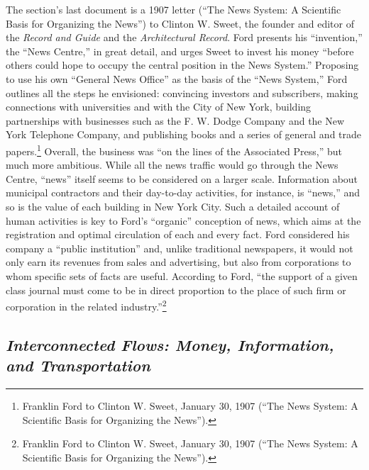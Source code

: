 \documentclass[openany,nobib]{tufte-book}
\begin{document}
The section's last document is a 1907 letter (``The News System: A
Scientific Basis for Organizing the News'') to Clinton W. Sweet, the
founder and editor of the \emph{Record and Guide} and the
\emph{Architectural Record}. Ford presents his ``invention,'' the ``News
Centre,'' in great detail, and urges Sweet to invest his money ``before
others could hope to occupy the central position in the News System.''
Proposing to use his own ``General News Office'' as the basis of the
``News System,'' Ford outlines all the steps he envisioned: convincing
investors and subscribers, making connections with universities and with
the City of New York, building partnerships with businesses such as the
F. W. Dodge Company and the New York Telephone Company, and publishing
books and a series of general and trade papers.\footnote{Franklin Ford
  to Clinton W. Sweet, January 30, 1907 (``The News System: A Scientific
  Basis for Organizing the News'').} Overall, the business was ``on the
lines of the Associated Press,'' but much more ambitious. While all the
news traffic would go through the News Centre, ``news'' itself seems to
be considered on a larger scale. Information about municipal contractors
and their day-to-day activities, for instance, is ``news,'' and so is
the value of each building in New York City. Such a detailed account of
human activities is key to Ford's ``organic'' conception of news, which
aims at the registration and optimal circulation of each and every fact.
Ford considered his company a ``public institution'' and, unlike
traditional newspapers, it would not only earn its revenues from sales
and advertising, but also from corporations to whom specific sets of
facts are useful. According to Ford, ``the support of a given class
journal must come to be in direct proportion to the place of such firm
or corporation in the related industry.''\footnote{Franklin Ford to
  Clinton W. Sweet, January 30, 1907 (``The News System: A Scientific
  Basis for Organizing the News'').}

\hypertarget{interconnected-flows-money-information-and-transportation}{%
\subsection{\texorpdfstring{\emph{Interconnected Flows: Money,
Information, and
Transportation}}{Interconnected Flows: Money, Information, and Transportation}}\label{interconnected-flows-money-information-and-transportation}}
\end{document}
